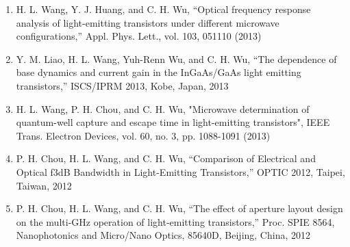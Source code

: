 \documentclass[letterpaper,11pt]{article}
\begin{document}
\begin{enumerate}
\item H. L. Wang, Y. J. Huang, and C. H. Wu, “Optical frequency response analysis of light-emitting transistors under different microwave configurations,” Appl. Phys. Lett., vol. 103, 051110 (2013)
\item Y. M. Liao, H. L. Wang, Yuh-Renn Wu, and C. H. Wu, “The dependence of base dynamics and current gain in the InGaAs/GaAs light emitting transistors,” ISCS/IPRM 2013, Kobe, Japan, 2013
\item H. L. Wang, P. H. Chou, and C. H. Wu, "Microwave determination of quantum-well capture and escape time in light-emitting transistors", IEEE Trans. Electron Devices, vol. 60, no. 3, pp. 1088-1091 (2013)
\item P. H. Chou, H. L. Wang, and C. H. Wu, “Comparison of Electrical and Optical f3dB Bandwidth in Light-Emitting Transistors,” OPTIC 2012, Taipei, Taiwan, 2012
\item P. H. Chou, H. L. Wang, and C. H. Wu, “The effect of aperture layout design on the multi-GHz operation of light-emitting transistors,” Proc. SPIE 8564, Nanophotonics and Micro/Nano Optics, 85640D, Beijing, China, 2012
  
\end{enumerate}
\end{document}
